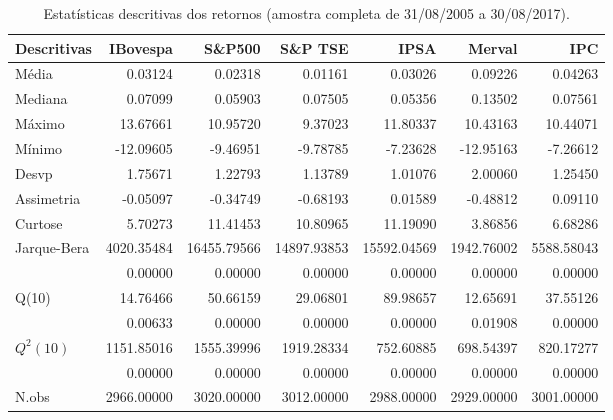 \begin{table}[H]
\centering
\caption{Estatísticas descritivas dos retornos 
               (amostra completa de 31/08/2005 a 30/08/2017).} 
\label{tab:descritivas}
\begin{tabular}{lrrrrrr}
  \hline
Descritivas & IBovespa & S\&P500 & S\&P TSE & IPSA & Merval & IPC \\ 
  \hline
Média & 0.03124 & 0.02318 & 0.01161 & 0.03026 & 0.09226 & 0.04263 \\ 
  Mediana & 0.07099 & 0.05903 & 0.07505 & 0.05356 & 0.13502 & 0.07561 \\ 
  Máximo & 13.67661 & 10.95720 & 9.37023 & 11.80337 & 10.43163 & 10.44071 \\ 
  Mínimo & -12.09605 & -9.46951 & -9.78785 & -7.23628 & -12.95163 & -7.26612 \\ 
  Desvp & 1.75671 & 1.22793 & 1.13789 & 1.01076 & 2.00060 & 1.25450 \\ 
  Assimetria & -0.05097 & -0.34749 & -0.68193 & 0.01589 & -0.48812 & 0.09110 \\ 
  Curtose & 5.70273 & 11.41453 & 10.80965 & 11.19090 & 3.86856 & 6.68286 \\ 
  Jarque-Bera & 4020.35484 & 16455.79566 & 14897.93853 & 15592.04569 & 1942.76002 & 5588.58043 \\ 
   & 0.00000 & 0.00000 & 0.00000 & 0.00000 & 0.00000 & 0.00000 \\ 
  Q(10) & 14.76466 & 50.66159 & 29.06801 & 89.98657 & 12.65691 & 37.55126 \\ 
   & 0.00633 & 0.00000 & 0.00000 & 0.00000 & 0.01908 & 0.00000 \\ 
  $Q^2(10)$ & 1151.85016 & 1555.39996 & 1919.28334 & 752.60885 & 698.54397 & 820.17277 \\ 
   & 0.00000 & 0.00000 & 0.00000 & 0.00000 & 0.00000 & 0.00000 \\ 
  N.obs & 2966.00000 & 3020.00000 & 3012.00000 & 2988.00000 & 2929.00000 & 3001.00000 \\ 
   \hline
\end{tabular}
\end{table}
